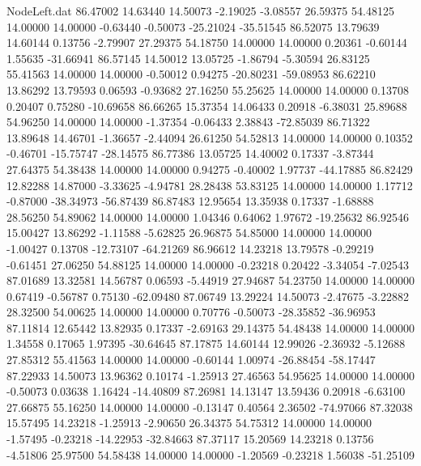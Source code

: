 \begin{filecontents}{NodeLeft.dat}
  86.47002   14.63440   14.50073    -2.19025   -3.08557   26.59375   54.48125   14.00000   14.00000   -0.63440   -0.50073  -25.21024  -35.51545
  86.52075   13.79639   14.60144     0.13756   -2.79907   27.29375   54.18750   14.00000   14.00000    0.20361   -0.60144    1.55635  -31.66941
  86.57145   14.50012   13.05725    -1.86794   -5.30594   26.83125   55.41563   14.00000   14.00000   -0.50012    0.94275  -20.80231  -59.08953
  86.62210   13.86292   13.79593     0.06593   -0.93682   27.16250   55.25625   14.00000   14.00000    0.13708    0.20407    0.75280  -10.69658
  86.66265   15.37354   14.06433     0.20918   -6.38031   25.89688   54.96250   14.00000   14.00000   -1.37354   -0.06433    2.38843  -72.85039
  86.71322   13.89648   14.46701    -1.36657   -2.44094   26.61250   54.52813   14.00000   14.00000    0.10352   -0.46701  -15.75747  -28.14575
  86.77386   13.05725   14.40002     0.17337   -3.87344   27.64375   54.38438   14.00000   14.00000    0.94275   -0.40002    1.97737  -44.17885
  86.82429   12.82288   14.87000    -3.33625   -4.94781   28.28438   53.83125   14.00000   14.00000    1.17712   -0.87000  -38.34973  -56.87439
  86.87483   12.95654   13.35938     0.17337   -1.68888   28.56250   54.89062   14.00000   14.00000    1.04346    0.64062    1.97672  -19.25632
  86.92546   15.00427   13.86292    -1.11588   -5.62825   26.96875   54.85000   14.00000   14.00000   -1.00427    0.13708  -12.73107  -64.21269
  86.96612   14.23218   13.79578    -0.29219   -0.61451   27.06250   54.88125   14.00000   14.00000   -0.23218    0.20422   -3.34054   -7.02543
  87.01689   13.32581   14.56787     0.06593   -5.44919   27.94687   54.23750   14.00000   14.00000    0.67419   -0.56787    0.75130  -62.09480
  87.06749   13.29224   14.50073    -2.47675   -3.22882   28.32500   54.00625   14.00000   14.00000    0.70776   -0.50073  -28.35852  -36.96953
  87.11814   12.65442   13.82935     0.17337   -2.69163   29.14375   54.48438   14.00000   14.00000    1.34558    0.17065    1.97395  -30.64645
  87.17875   14.60144   12.99026    -2.36932   -5.12688   27.85312   55.41563   14.00000   14.00000   -0.60144    1.00974  -26.88454  -58.17447
  87.22933   14.50073   13.96362     0.10174   -1.25913   27.46563   54.95625   14.00000   14.00000   -0.50073    0.03638    1.16424  -14.40809
  87.26981   14.13147   13.59436     0.20918   -6.63100   27.66875   55.16250   14.00000   14.00000   -0.13147    0.40564    2.36502  -74.97066
  87.32038   15.57495   14.23218    -1.25913   -2.90650   26.34375   54.75312   14.00000   14.00000   -1.57495   -0.23218  -14.22953  -32.84663
  87.37117   15.20569   14.23218     0.13756   -4.51806   25.97500   54.58438   14.00000   14.00000   -1.20569   -0.23218    1.56038  -51.25109

\end{filecontents}
